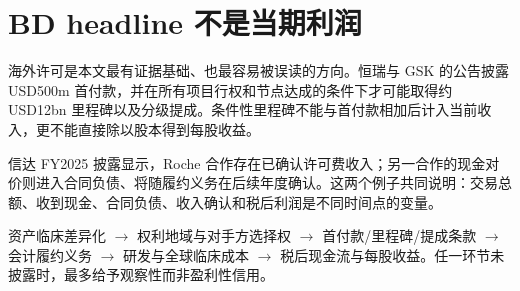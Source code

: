 \section{BD headline 不是当期利润}
海外许可是本文最有证据基础、也最容易被误读的方向。恒瑞与 GSK 的公告披露 USD500m 首付款，并在所有项目行权和节点达成的条件下才可能取得约 USD12bn 里程碑以及分级提成。条件性里程碑不能与首付款相加后计入当前收入，更不能直接除以股本得到每股收益。

信达 FY2025 披露显示，Roche 合作存在已确认许可费收入；另一合作的现金对价则进入合同负债、将随履约义务在后续年度确认。这两个例子共同说明：交易总额、收到现金、合同负债、收入确认和税后利润是不同时间点的变量。

\begin{keyinsight}[研究中的正确 BD 桥]
资产临床差异化 $\rightarrow$ 权利地域与对手方选择权 $\rightarrow$ 首付款/里程碑/提成条款 $\rightarrow$ 会计履约义务 $\rightarrow$ 研发与全球临床成本 $\rightarrow$ 税后现金流与每股收益。任一环节未披露时，最多给予观察性而非盈利性信用。
\end{keyinsight}
